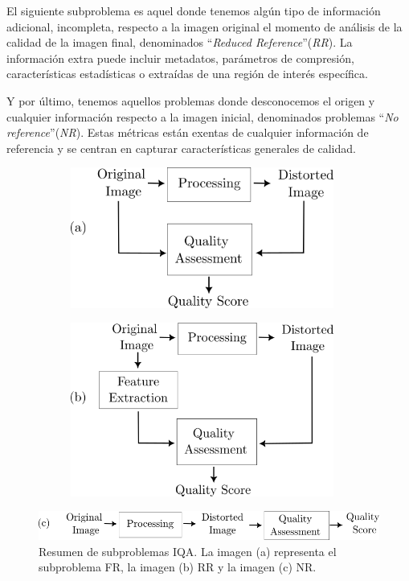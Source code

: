 El siguiente subproblema es aquel donde tenemos algún tipo de información adicional, incompleta, respecto 
a la imagen original el momento de análisis de la calidad de la imagen final,
denominados ``\emph{Reduced Reference}''(\emph{RR}). La información extra puede 
incluir metadatos, parámetros 
de compresión, características estadísticas o extraídas de una región de interés específica.
 
Y por último, tenemos aquellos problemas donde desconocemos el origen y cualquier 
información respecto a la imagen inicial, denominados problemas ``\emph{No reference}''(\emph{NR}).
Estas métricas están exentas de cualquier información de referencia y se 
centran en capturar características generales de calidad.

\begin{figure}[htp]
  \centering
  \begin{subfigure}{0.49\textwidth}
  \includegraphics[width=0.95\textwidth]{imagenes/chapter2/FullReferenceInk.png}
  \end{subfigure}
  \begin{subfigure}{0.49\textwidth}
  \includegraphics[width=0.95\textwidth]{imagenes/chapter2/ReducedReferenceInk.png}
  \end{subfigure}
  \par\bigskip
  \includegraphics[]{imagenes/chapter2/NoReferenceInk.png}
  \caption[Resumen de subproblemas de IQA.]{Resumen de subproblemas IQA. La imagen (a) representa el subproblema FR, 
  la imagen (b) RR y la imagen (c) NR.}
  \label{fig:IQASubproblems}
\end{figure}


